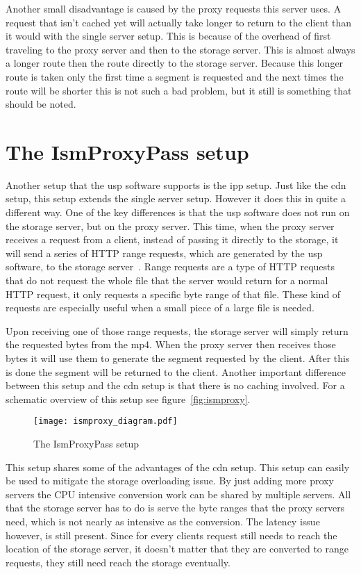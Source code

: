 \documentclass[twoside,openright]{uva-bachelor-thesis}
\begin{document}
Another small disadvantage is caused by the proxy requests this server uses. A
request that isn't cached yet will actually take longer to return to the client
than it would with the single server setup. This is because of the overhead of
first traveling to the proxy server and then to the storage server. This is
almost always a longer route then the route directly to the storage server.
Because this longer route is taken only the first time a segment is requested
and the next times the route will be shorter this is not such a bad problem, but
it still is something that should be noted.


\section{The IsmProxyPass setup}
Another setup that the \gls{usp} software supports is the \gls{ipp} setup. Just
like the \gls{cdn} setup, this setup extends the single server setup. However it
does this in quite a different way. One of the key differences is that the
\gls{usp} software does not run on the storage server, but on the proxy server.
This time, when the proxy server receives a request from a client, instead of
passing it directly to the storage, it will send a series of HTTP range
requests, which are generated by the \gls{usp} software, to the storage
server~\autocite{rangerequests}. Range requests are a type of
HTTP requests that do not request the whole file that the server would return
for a normal HTTP request, it only requests a specific byte range of that file.
These kind of requests are especially useful when a small piece of a large file
is needed.

Upon receiving one of those range requests, the storage server will simply
return the requested bytes from the mp4. When the proxy server then receives
those bytes it will use them to generate the segment requested by the client.
After this is done the segment will be returned to the client. Another important
difference between this setup and the \gls{cdn} setup is that there is no
caching involved.  For a schematic overview of this setup see
figure~\vref{fig:ismproxy}.

\begin{figure}[h]
    \texttt{[image: ismproxy\_diagram.pdf]}
    \caption{The IsmProxyPass setup}\label{fig:ismproxy}
\end{figure}

This setup shares some of the advantages of the \gls{cdn} setup. This setup can easily
be used to mitigate the storage overloading issue. By just adding more proxy
servers the CPU intensive conversion work can be shared by multiple servers. All
that the storage server has to do is serve the byte ranges that the proxy
servers need, which is not nearly as intensive as the conversion. The latency
issue however, is still present. Since for every clients request still needs to
reach the location of the storage server, it doesn't matter that they are
converted to range requests, they still need reach the storage eventually.
\end{document}
